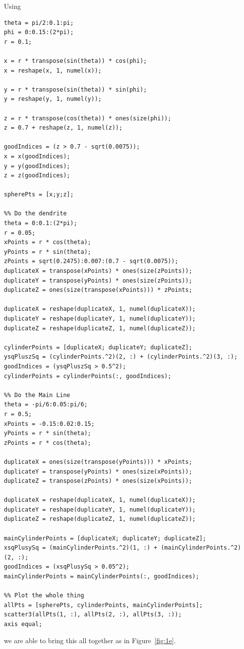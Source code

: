 \documentclass[a4paper,10pt]{article}
\begin{document}
Using
\begin{verbatim}
theta = pi/2:0.1:pi;
phi = 0:0.15:(2*pi);
r = 0.1;

x = r * transpose(sin(theta)) * cos(phi);
x = reshape(x, 1, numel(x));

y = r * transpose(sin(theta)) * sin(phi);
y = reshape(y, 1, numel(y));

z = r * transpose(cos(theta)) * ones(size(phi));
z = 0.7 + reshape(z, 1, numel(z));

goodIndices = (z > 0.7 - sqrt(0.0075));
x = x(goodIndices);
y = y(goodIndices);
z = z(goodIndices);

spherePts = [x;y;z];

%% Do the dendrite
theta = 0:0.1:(2*pi);
r = 0.05;
xPoints = r * cos(theta);
yPoints = r * sin(theta);
zPoints = sqrt(0.2475):0.007:(0.7 - sqrt(0.0075));
duplicateX = transpose(xPoints) * ones(size(zPoints));
duplicateY = transpose(yPoints) * ones(size(zPoints));
duplicateZ = ones(size(transpose(xPoints))) * zPoints;

duplicateX = reshape(duplicateX, 1, numel(duplicateX));
duplicateY = reshape(duplicateY, 1, numel(duplicateY));
duplicateZ = reshape(duplicateZ, 1, numel(duplicateZ));

cylinderPoints = [duplicateX; duplicateY; duplicateZ];
ysqPluszSq = (cylinderPoints.^2)(2, :) + (cylinderPoints.^2)(3, :);
goodIndices = (ysqPluszSq > 0.5^2);
cylinderPoints = cylinderPoints(:, goodIndices);

%% Do the Main Line
theta = -pi/6:0.05:pi/6;
r = 0.5;
xPoints = -0.15:0.02:0.15;
yPoints = r * sin(theta);
zPoints = r * cos(theta);

duplicateX = ones(size(transpose(yPoints))) * xPoints;
duplicateY = transpose(yPoints) * ones(size(xPoints));
duplicateZ = transpose(zPoints) * ones(size(xPoints));

duplicateX = reshape(duplicateX, 1, numel(duplicateX));
duplicateY = reshape(duplicateY, 1, numel(duplicateY));
duplicateZ = reshape(duplicateZ, 1, numel(duplicateZ));

mainCylinderPoints = [duplicateX; duplicateY; duplicateZ];
xsqPlusySq = (mainCylinderPoints.^2)(1, :) + (mainCylinderPoints.^2)(2, :);
goodIndices = (xsqPlusySq > 0.05^2);
mainCylinderPoints = mainCylinderPoints(:, goodIndices);

%% Plot the whole thing
allPts = [spherePts, cylinderPoints, mainCylinderPoints];
scatter3(allPts(1, :), allPts(2, :), allPts(3, :));
axis equal;
\end{verbatim}
we are able to bring this all together as in Figure~\ref{fig:1e}.
\end{document}
